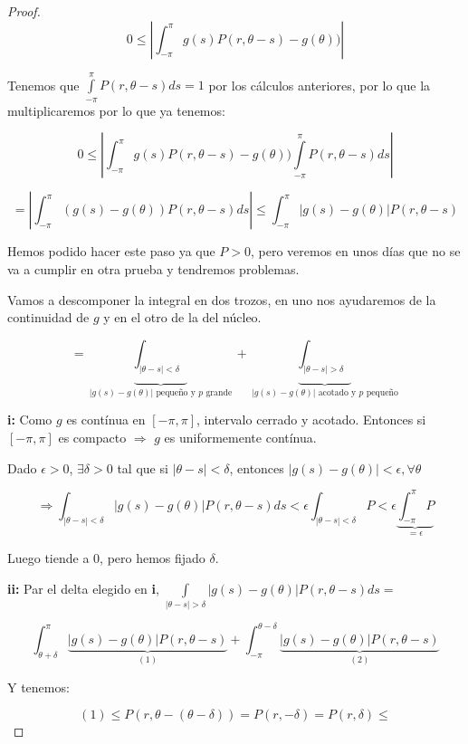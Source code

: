 			\begin{proof}

				\[0 \leq \left| \int_{-\pi}^{\pi} g(s) P(r, \theta-s) - g(\theta))  \right| \]

				Tenemos que $\int\limits_{-\pi}^{\pi} P(r, \theta-s) ds = 1$ por los cálculos anteriores, por lo que la multiplicaremos por lo que ya tenemos:

				\[0 \leq \left| \int_{-\pi}^{\pi} g(s) P(r, \theta-s) - g(\theta))  \int\limits_{-\pi}^{\pi} P(r, \theta-s) ds  \right| \]

				\[ = \left| \int_{-\pi}^\pi (g(s) - g(\theta)) P(r, \theta - s) ds \right|  \leq \int^{\pi}_{-\pi} | g(s) - g(\theta) | P(r, \theta- s) \]

				Hemos podido hacer este paso ya que $P>0$, pero veremos en unos días que no se va a cumplir en otra prueba y tendremos problemas.

				Vamos a descomponer la integral en dos trozos, en uno nos ayudaremos de la continuidad de $g$ y en el otro de la del núcleo.

				\[ = \underbrace{\int_{|\theta-s|< \delta}}_{|g(s) - g(\theta)| \text{ pequeño y }p\text{ grande}} + \underbrace{\int_{|\theta-s| > \delta}}_{|g(s) - g(\theta)| \text{ acotado y }p\text{ pequeño}} \]

				\textbf{i:} Como $g$ es contínua en $[-\pi,\pi]$, intervalo cerrado y acotado. Entonces si $[-\pi,\pi]$ es compacto $\Rightarrow$ $g$ es uniformemente contínua.

				Dado $\epsilon > 0$, $\exists \delta > 0$ tal que si $|\theta-s| < \delta$, entonces $|g(s) - g(\theta)| < \epsilon, \forall \theta$

				\[\Rightarrow \int_{|\theta - s| < \delta} |g(s) - g(\theta) | P(r, \theta - s) ds < \epsilon \int_{|\theta - s| < \delta} P < \epsilon  \underbrace{\int_{-\pi}^{\pi} P}_{= \epsilon}    \]

				Luego tiende a 0, pero hemos fijado $\delta$.

				\textbf{ii:} Par el delta elegido en \textbf{i}, $\int\limits_{|\theta - s | > \delta} |g(s) - g(\theta)| P(r, \theta-s) ds = $

				\[
					\int_{\theta+\delta}^\pi \underbrace{|g(s) - g(\theta)| P(r, \theta-s)}_{(1)} +  \int_{-\pi}^{\theta-\delta} \underbrace{|g(s) - g(\theta)| P(r, \theta-s)}_{(2)}
				\]

				Y tenemos:

				\[ (1) \leq P(r, \theta-(\theta-\delta)) = P(r, -\delta) = P(r, \delta) \leq  \]


\end{proof}
